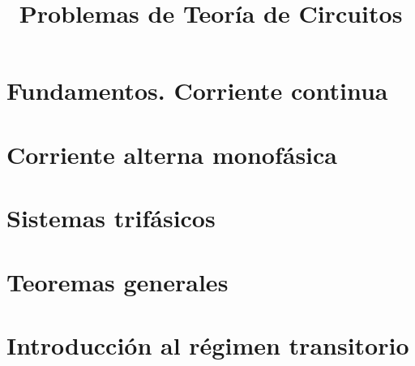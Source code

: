 \documentclass[oldfontcommands,a4paper]{memoir}
\begin{document}
\begin{titlingpage}

\title{Problemas de Teoría de Circuitos}

\author{}

\date{}

\maketitle


\end{titlingpage}

\frontmatter

\cleardoublepage{}

\tableofcontents*

\cleardoublepage{}

\mainmatter

\chapter{Fundamentos. Corriente continua}



\chapter{Corriente alterna monofásica}



\chapter{Sistemas trifásicos}



\chapter{Teoremas generales}



\chapter{Introducción al régimen transitorio}




\backmatter
\end{document}
